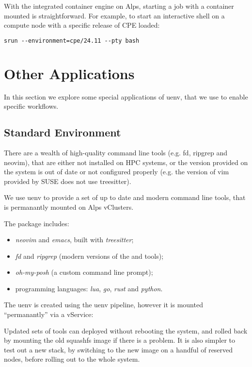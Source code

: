 With the integrated container engine on Alps, starting a job with a container mounted is straightforward.
For example, to start an interactive shell on a compute node with a specific release of CPE loaded:
\begin{lstlisting}
srun --environment=cpe/24.11 --pty bash
\end{lstlisting}

\section{Other Applications}

In this section we explore some special applications of uenv, that we use to enable specific workflows.

\subsection{Standard Environment}

There are a wealth of high-quality command line tools (e.g. fd, ripgrep and neovim), that are either not installed on HPC systems, or the version provided on the system is out of date or not configured properly (e.g. the version of vim provided by SUSE does not use treesitter).

We use uenv to provide a set of up to date and modern command line tools, that is permanantly mounted on Alps vClusters.

The package includes:
\begin{itemize}
    \item \emph{neovim} and \emph{emacs}, built with \emph{treesitter};
    \item \emph{fd} and \emph{ripgrep} (modern versions of the  and  tools);
    \item \emph{oh-my-posh} (a custom command line prompt);
    \item programming languages: \emph{lua}, \emph{go}, \emph{rust} and \emph{python}.
\end{itemize}

The uenv is created using the uenv pipeline, however it is mounted ``permanantly'' via a vService:


Updated sets of tools can deployed without rebooting the system, and rolled back by mounting the old squashfs image if there is a problem.
It is also simpler to test out a new stack, by switching to the new image on a handful of reserved nodes, before rolling out to the whole system.

